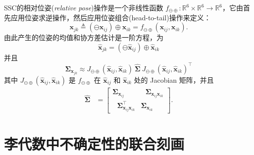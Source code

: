 SSC的相对位姿(\textit{relative pose})操作是一个非线性函数 $f_{\ominus\oplus}: \mathbb{R}^6 \times \mathbb{R}^6 \rightarrow \mathbb{R}^6$，它由首先应用位姿求逆操作，然后应用位姿组合(head-to-tail)操作来定义： 
\begin{equation}
    \mathbf{x}_{jk} \triangleq (\ominus \mathbf{x}_{ij}) \oplus \mathbf{x}_{ik} = f_{\ominus\oplus}(\mathbf{x}_{ij}, \mathbf{x}_{ik}).
\end{equation}
由此产生的位姿的均值和协方差估计是一阶方程，为
\begin{equation}
    \hat{\mathbf{x}}_{jk} = (\ominus \hat{\mathbf{x}}_{ij}) \oplus \hat{\mathbf{x}}_{ik}
\end{equation}
并且 
\begin{equation}
    \boldsymbol{\Sigma}_{\mathbf{x}_{jk}} \approx J_{\ominus\oplus}(\hat{\mathbf{x}}_{ij}, \hat{\mathbf{x}}_{ik}) ~ \hat{\boldsymbol{\Sigma}} ~
    J_{\ominus\oplus}(\hat{\mathbf{x}}_{ij}, \hat{\mathbf{x}}_{ik})^\top
\end{equation}
其中 
$J_{\ominus\oplus}(\hat{\mathbf{x}}_{ij}, \hat{\mathbf{x}}_{ik})$ 是 $f_{\ominus\oplus}$ 在 $\hat{\mathbf{x}}_{ij}$ 和 $\hat{\mathbf{x}}_{ik}$ 处的 Jacobian 矩阵，并且 
\begin{align}
    \hat{\boldsymbol{\Sigma}} 
    &= 
    \left[ \begin{array}{cc}
        \boldsymbol{\Sigma}_{
        \mathbf{x}_{ij}} & ~~~\boldsymbol{\Sigma}_{\mathbf{x}_{ij}\mathbf{x}_{ik}}  \\
        ~~~\boldsymbol{\Sigma}_{\mathbf{x}_{ij}\mathbf{x}_{ik}}^\top & \boldsymbol{\Sigma}_{\mathbf{x}_{ik}}
    \end{array} \right]. 
\end{align} 


\section{李代数中不确定性的联合刻画}
\label{sec:lie_joint_uncertainty}


